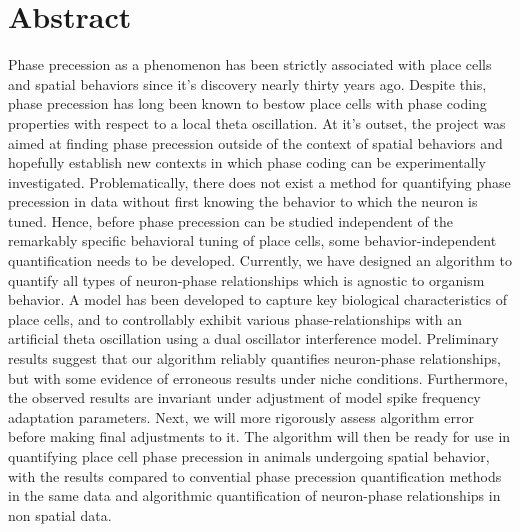 \documentclass[12pt, letterpaper]{article}
\newenvironment{collapsable}{}{}
\begin{document}
\begin{collapsable}
  \section*{\normalfont\normalsize\bf Abstract}
  Phase precession as a phenomenon has been strictly associated with place cells and
  spatial behaviors since it's discovery nearly thirty years ago. Despite this,
  phase precession has long been known to bestow place cells with phase coding
  properties with respect to a local theta oscillation. At it's outset, the
  project was aimed at finding phase precession outside of the context of
  spatial behaviors and hopefully establish new contexts in which phase coding
  can be experimentally investigated. Problematically, there does not exist a
  method for quantifying phase precession in data without first knowing
  the behavior to which the neuron is tuned. Hence, before phase precession can
  be studied independent of the remarkably specific behavioral tuning of place
  cells, some behavior-independent quantification needs to be developed.
  Currently, we have designed an algorithm to quantify all types of neuron-phase
  relationships which is agnostic to organism behavior. A model has been
  developed to capture key biological characteristics of place cells, and to
  controllably exhibit various phase-relationships with an artificial theta
  oscillation using a dual oscillator interference model. Preliminary results
  suggest that our algorithm reliably quantifies neuron-phase relationships, but
  with some evidence of erroneous results under niche conditions. Furthermore,
  the observed results are invariant under adjustment of model spike frequency
  adaptation parameters. Next, we will more rigorously assess algorithm error
  before making final adjustments to it. The algorithm will then be ready for
  use in quantifying place cell phase precession in animals undergoing spatial
  behavior, with the results compared to convential phase precession
  quantification methods in the same data and algorithmic quantification of
  neuron-phase relationships in non spatial data.
\end{collapsable}
\end{document}
